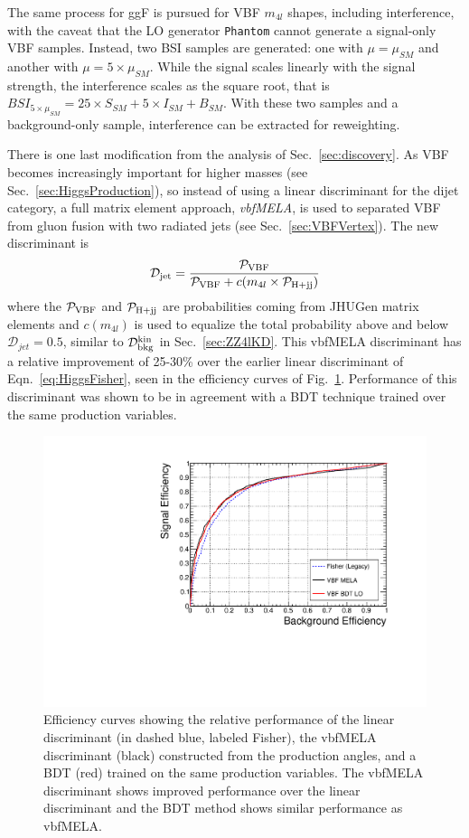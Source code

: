 The same process for ggF is pursued for VBF $m_{4l}$ shapes, including interference, with the caveat that the LO generator {\tt Phantom} cannot generate a signal-only VBF samples. Instead, two BSI samples are generated: one with $\mu=\mu_{SM}$ and another with $\mu=5\times\mu_{SM}$. While the signal scales linearly with the signal strength, the interference scales as the square root, that is $BSI_{5\times\mu_{SM}} = 25\times S_{SM} + 5\times I_{SM} + B_{SM}$. With these two samples and a background-only sample, interference can be extracted for reweighting.

There is one last modification from the analysis of Sec.~\ref{sec:discovery}. As VBF becomes increasingly important for higher masses (see Sec.~\ref{sec:HiggsProduction}), so instead of using a linear discriminant for the dijet category, a full matrix element approach, \textit{vbfMELA}, is used to separated VBF from gluon fusion with two radiated jets (see Sec.~\ref{sec:VBFVertex}). The new discriminant is 
\begin{equation}
\mathcal{D}_{\rm{jet}}=\frac{\mathcal{P}_{\rm{VBF}}}{\mathcal{P}_{\rm{VBF}} + c(m_{4l}\times \mathcal{P}_{\rm{H+jj}})}
\end{equation}
where the $\mathcal{P}_{\rm{VBF}}$ and $\mathcal{P}_{\rm{H+jj}}$ are probabilities coming from JHUGen matrix elements and $c(m_{4l})$ is used to equalize the total probability above and below $\mathcal{D}_{jet}=0.5$, similar to $\mathcal{D}_{\rm{bkg}}^{\rm{kin}}$ in Sec.~\ref{sec:ZZ4lKD}. This vbfMELA discriminant has a relative improvement of 25-30\% over the earlier linear discriminant of Eqn.~\ref{eq:HiggsFisher}, seen in the efficiency curves of Fig.~\ref{fig:vbfMELAROC}. Performance of this discriminant was shown to be in agreement with a BDT technique trained over the same production variables.

\begin{figure}[htbp]
\begin{center}
\includegraphics[width=.6\linewidth]{HiggsProperties/figures/BDTROC_vbf.pdf}
\caption[Improvement of the $\mathcal{D}_{\rm{jet}}$ Discriminant Using MELA Techniques]{Efficiency curves showing the relative performance of the linear discriminant (in dashed blue, labeled Fisher), the vbfMELA discriminant (black) constructed from the production angles, and a BDT (red) trained on the same production variables. The vbfMELA discriminant shows improved performance over the linear discriminant and the BDT method shows similar performance as vbfMELA.}
\label{fig:vbfMELAROC}
\end{center}
\end{figure}

